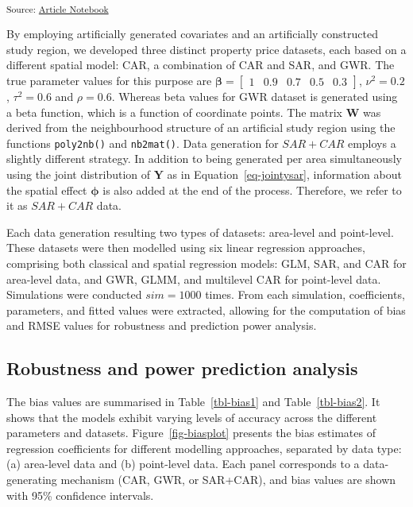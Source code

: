 \documentclass[
  default,
]{sn-jnl}
\begin{document}
\endgroup{}

\textsubscript{Source:
\href{https://indiraputeri-phd.github.io/CAR_simcomp/manuscript.qmd.html}{Article
Notebook}}

By employing artificially generated covariates and an artificially
constructed study region, we developed three distinct property price
datasets, each based on a different spatial model: CAR, a combination of
CAR and SAR, and GWR. The true parameter values for this purpose are
\(\boldsymbol{\beta} = \begin{bmatrix} 1 & 0.9 & 0.7 & 0.5 & 0.3 \end{bmatrix}\),
\(\nu^2 = 0.2\), \(\tau^2 = 0.6\) and \(\rho = 0.6\). Whereas beta
values for GWR dataset is generated using a beta function, which is a
function of coordinate points. The matrix \(\mathbf{W}\) was derived
from the neighbourhood structure of an artificial study region using the
functions \texttt{poly2nb()} and \texttt{nb2mat()}. Data generation for
\(SAR + CAR\) employs a slightly different strategy. In addition to
being generated per area simultaneously using the joint distribution of
\(\mathbf{Y}\) as in Equation~\ref{eq-jointysar}, information about the
spatial effect \(\boldsymbol{\phi}\) is also added at the end of the
process. Therefore, we refer to it as \(SAR + CAR\) data.

Each data generation resulting two types of datasets: area-level and
point-level. These datasets were then modelled using six linear
regression approaches, comprising both classical and spatial regression
models: GLM, SAR, and CAR for area-level data, and GWR, GLMM, and
multilevel CAR for point-level data. Simulations were conducted
\(sim = 1000\) times. From each simulation, coefficients, parameters,
and fitted values were extracted, allowing for the computation of bias
and RMSE values for robustness and prediction power analysis.

\subsection{Robustness and power prediction
analysis}\label{robustness-and-power-prediction-analysis}

The bias values are summarised in Table~\ref{tbl-bias1} and
Table~\ref{tbl-bias2}. It shows that the models exhibit varying levels
of accuracy across the different parameters and datasets.
Figure~\ref{fig-biasplot} presents the bias estimates of regression
coefficients for different modelling approaches, separated by data type:
(a) area-level data and (b) point-level data. Each panel corresponds to
a data-generating mechanism (CAR, GWR, or SAR+CAR), and bias values are
shown with 95\% confidence intervals.
\end{document}
